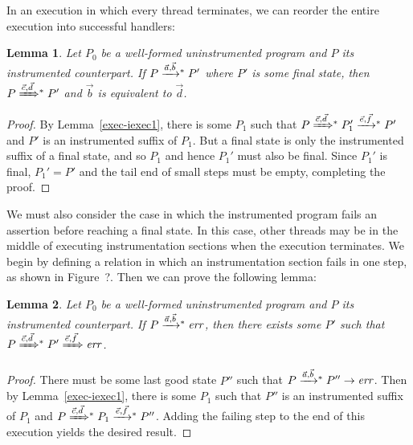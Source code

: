 \documentclass[preprint, 10pt]{sigplanconf}
\newcommand{\tto}[1]{\mathrel{
  \vphantom{\xrightarrow{#1}}
  \smash{\xrightarrow{#1}}
  \vphantom{\to}^{*}}
}
\newcommand{\tTo}[1]{\mathrel{
  \vphantom{\xrightarrow{#1}}
  \smash{\xRightarrow{#1}}
  \vphantom{\to}^{*}}
}
\newtheorem{lemma}{Lemma}
\begin{document}
In an execution in which every thread terminates, we can reorder the entire execution into successful handlers:
\begin{lemma}\label{exec-iexec}Let $P_0$ be a well-formed uninstrumented program and $P$ its instrumented counterpart. If $P \tto{\vec{a}, \vec{b}} P'$ where $P'$ is some final state, then $P \tTo{\vec{c}, \vec{d}} P'$ and $\vec{b}$ is equivalent to $\vec{d}$.\end{lemma}
\begin{proof}By Lemma~\ref{exec-iexec1}, there is some $P_1$ such that $P \tTo{\vec{c}, \vec{d}} P_1' \tto{\vec{e}, \vec{f}} P'$ and $P'$ is an instrumented suffix of $P_1$. But a final state is only the instrumented suffix of a final state, and so $P_1$ and hence $P_1'$ must also be final. Since $P_1'$ is final, $P_1' = P'$ and the tail end of small steps must be empty, completing the proof.\end{proof}

We must also consider the case in which the instrumented program fails an assertion before reaching a final state. In this case, other threads may be in the middle of executing instrumentation sections when the execution terminates. We begin by defining a relation in which an instrumentation section fails in one step, as shown in Figure~?. Then we can prove the following lemma:
\begin{lemma}\label{exec-fail-iexec}Let $P_0$ be a well-formed uninstrumented program and $P$ its instrumented counterpart. If $P \tto{\vec{a}, \vec{b}} \mathit{err}$, then there exists some $P'$ such that $P \tTo{\vec{c}, \vec{d}} P' \xRightarrow{\vec{e}, \vec{f}} \mathit{err}$.\end{lemma}
\begin{proof}There must be some last good state $P''$ such that $P \tto{\vec{a}, \vec{b}} P'' \rightarrow \mathit{err}$. Then by Lemma~\ref{exec-iexec1}, there is some $P_1$ such that $P''$ is an instrumented suffix of $P_1$ and $P \tTo{\vec{c}, \vec{d}} P_1 \tto{\vec{e}, \vec{f}} P''$. Adding the failing step to the end of this execution yields the desired result.\end{proof}
\end{document}
